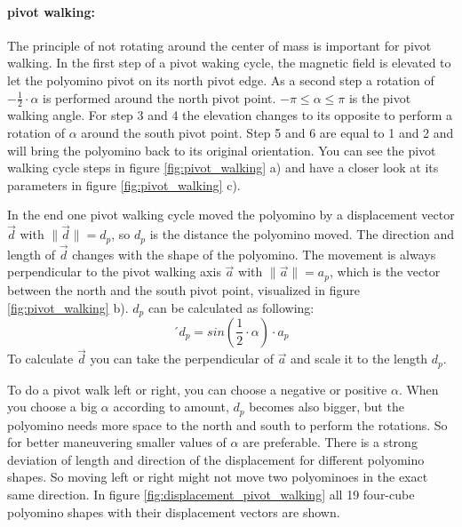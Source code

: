 \paragraph{pivot walking:}
The principle of not rotating around the center of mass is important for pivot walking.
In the first step of a pivot waking cycle, the magnetic field is elevated to let the polyomino pivot on its north pivot edge.
As a second step a rotation of $-\frac{1}{2} \cdot \alpha$ is performed around the north pivot point.
$-\pi \leq \alpha \leq \pi$ is the pivot walking angle.
For step 3 and 4 the elevation changes to its opposite to perform a rotation of $\alpha$ around the south pivot point.
Step 5 and 6 are equal to 1 and 2 and will bring the polyomino back to its original orientation.
You can see the pivot walking cycle steps in figure \ref{fig:pivot_walking} a) and have a closer look at its parameters in figure \ref{fig:pivot_walking} c).

In the end one pivot walking cycle moved the polyomino by a displacement vector $\vec{d}$ with $\lVert \vec{d} \rVert = d_p$, so $d_p$ is the distance the polyomino moved.
The direction and length of $\vec{d}$ changes with the shape of the polyomino.
The movement is always perpendicular to the pivot walking axis $\vec{a}$ with $\lVert \vec{a} \rVert = a_p$, which is the vector between the north and the south pivot point, visualized in figure \ref{fig:pivot_walking} b).
$d_p$ can be calculated as following:
\begin{equation*}´
d_p = sin(\frac{1}{2} \cdot \alpha) \cdot a_p
\end{equation*}
To calculate $\vec{d}$ you can take the perpendicular of $\vec{a}$ and scale it to the length $d_p$.

To do a pivot walk left or right, you can choose a negative or positive $\alpha$.
When you choose a big $\alpha$ according to amount, $d_p$ becomes also bigger, but the polyomino needs more space to the north and south to perform the rotations.
So for better maneuvering smaller values of $\alpha$ are preferable.
There is a strong deviation of length and direction of the displacement for different polyomino shapes.
So moving left or right might not move two polyominoes in the exact same direction.
In figure \ref{fig:displacement_pivot_walking} all 19 four-cube polyomino shapes with their displacement vectors are shown.

